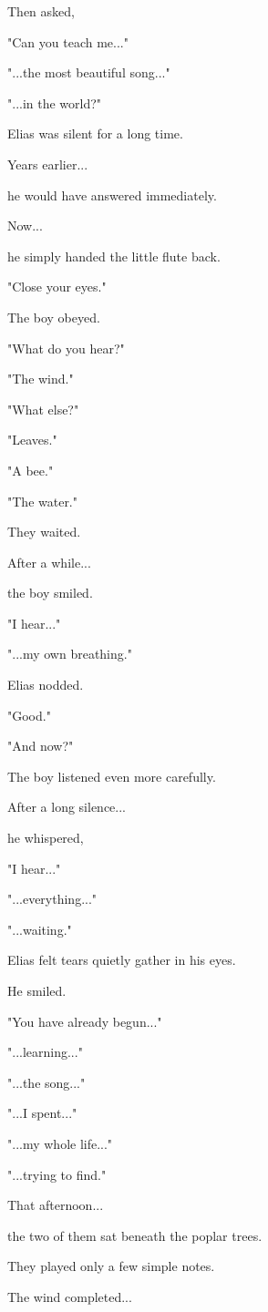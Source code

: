 \documentclass[12pt,openany]{book}
\begin{document}
Then asked,

"Can you teach me..."

"...the most beautiful song..."

"...in the world?"

Elias was silent for a long time.

Years earlier...

he would have answered immediately.

Now...

he simply handed the little flute back.

"Close your eyes."

The boy obeyed.

"What do you hear?"

"The wind."

"What else?"

"Leaves."

"A bee."

"The water."

They waited.

After a while...

the boy smiled.

"I hear..."

"...my own breathing."

Elias nodded.

"Good."

"And now?"

The boy listened even more carefully.

After a long silence...

he whispered,

"I hear..."

"...everything..."

"...waiting."

Elias felt tears quietly gather in his eyes.

He smiled.

"You have already begun..."

"...learning..."

"...the song..."

"...I spent..."

"...my whole life..."

"...trying to find."

That afternoon...

the two of them sat beneath the poplar trees.

They played only a few simple notes.

The wind completed...
\end{document}
